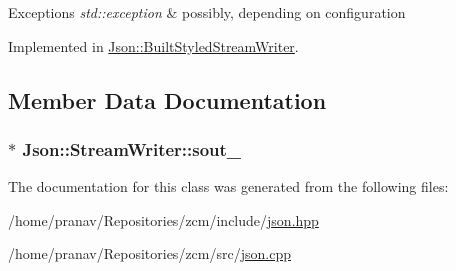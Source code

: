 \begin{DoxyExceptions}{Exceptions}
{\em std\+::exception} & possibly, depending on configuration \\
\hline
\end{DoxyExceptions}


Implemented in \hyperlink{structJson_1_1BuiltStyledStreamWriter_a823cdb1afabb6b0d5f39bcd5a6a6f747}{Json\+::\+Built\+Styled\+Stream\+Writer}.



\subsection{Member Data Documentation}
\subsubsection[{\texorpdfstring{sout\+\_\+}{sout_}}]{$\ast$ Json\+::\+Stream\+Writer\+::sout\+\_\+\hspace{0.3cm}{\ttfamily [protected]}}\hypertarget{classJson_1_1StreamWriter_a4f5603d4228a9fa46a42cb44e5234d9b}{}\label{classJson_1_1StreamWriter_a4f5603d4228a9fa46a42cb44e5234d9b}


The documentation for this class was generated from the following files\+:\begin{DoxyCompactItemize}
\item 
/home/pranav/\+Repositories/zcm/include/\hyperlink{json_8hpp}{json.\+hpp}\item 
/home/pranav/\+Repositories/zcm/src/\hyperlink{json_8cpp}{json.\+cpp}\end{DoxyCompactItemize}
